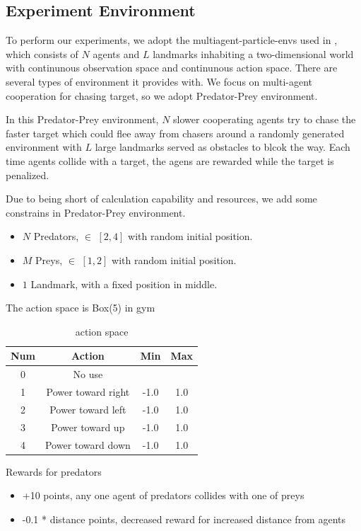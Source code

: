 \documentclass[11pt,twocolumn]{jarticle} %
\begin{document}
\subsection{Experiment Environment}
To perform our experiments, we adopt the multiagent-particle-envs used in \cite{maddpg}, which consists of $N$ agents and $L$ landmarks inhabiting a two-dimensional world with continunous observation space and continunous action space. There are several types of environment it provides with. We focus on multi-agent cooperation for chasing target, so we adopt Predator-Prey environment.\par
In this Predator-Prey environment, $N$ slower cooperating agents try to chase the faster target which could flee away from chasers around a randomly generated environment with $L$ large landmarks served as obstacles to blcok the way. Each time agents collide with a target, the agens are rewarded while the target is penalized. \par
Due to being short of calculation capability and resources, we add some constrains in Predator-Prey environment.
\begin{itemize}
  \item $N$ Predators, $\in$ $[2, 4]$ with random initial position.
  \item $M$ Preys, $\in$ $[1, 2]$ with random initial position.
  \item $1$ Landmark, with a fixed position in middle.
\end{itemize}
The action space is Box(5) in gym \cite{gym}
\begin{table}[ht]
 \caption{action space} 
 \label{tbl:action}
  \begin{center}
    \begin{tabular}{c|ccc}
  Num  & Action & Min & Max\\
  \hline \hline
  0 & No use &  & \\
  1 & Power toward right & -1.0 & 1.0\\
  2 & Power toward left & -1.0 & 1.0\\
  3 & Power toward up & -1.0 & 1.0\\
  4 & Power toward down & -1.0 & 1.0\\\hline
    \end{tabular}
  \end{center}
\end{table}
Rewards for predators
\begin{itemize}
  \item +10 points, any one agent of predators collides with one of preys
  \item -0.1 * distance points, decreased reward for increased distance from agents
\end{itemize}
\end{document}
